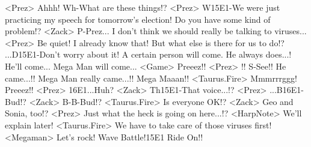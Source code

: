 <Prez> Ahhh! 
Wh-What are these things!? 
<Prez> W{15}{E1}-We were just practicing my speech for tomorrow's election! 
Do you have some kind of problem!? 
<Zack> P-Prez... 
I don't think we should really be talking to viruses... 
<Prez> Be quiet! 
I already know that! 
But what else is there for us to do!? 
...D{15}{E1}-Don't worry about it! 
A certain person will come. He always does...! 
He'll come... 
Mega Man will come... 
<Game> Preeez!! 
<Prez> !! 
S-See!! He came...!! 
Mega Man really came...!! 
Mega Maaan!! 
<Taurus.Fire> Mmmrrrggg! Preeez!! 
<Prez> {16}{E1}...Huh? 
<Zack> Th{15}{E1}-That voice...!? 
<Prez> ...B{16}{E1}-Bud!? 
<Zack> B-B-Bud!? 
<Taurus.Fire> Is everyone OK!? 
<Zack> Geo and Sonia, too!? 
<Prez> Just what the heck is going on here...!? 
<HarpNote> We'll explain later! 
<Taurus.Fire> We have to take care of those viruses first! 
<Megaman> Let's rock! 
Wave Battle!{15}{E1} Ride On!! 
